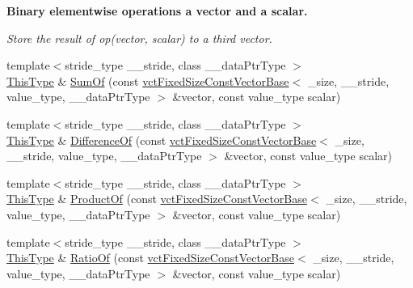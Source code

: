 \begin{Indent}{\bf Binary elementwise operations a vector and a scalar.}\par
{\em Store the result of op(vector, scalar) to a third vector. }\begin{DoxyCompactItemize}
\item 
{\footnotesize template$<$stride\+\_\+type \+\_\+\+\_\+stride, class \+\_\+\+\_\+data\+Ptr\+Type $>$ }\\\hyperlink{classvct_fixed_size_const_vector_base_a071063bc4fa43112cc287b2dbef53180}{This\+Type} \& \hyperlink{classvct_fixed_size_vector_base_a22b2c7baaf63523781a9b183a491691a}{Sum\+Of} (const \hyperlink{classvct_fixed_size_const_vector_base}{vct\+Fixed\+Size\+Const\+Vector\+Base}$<$ \+\_\+size, \+\_\+\+\_\+stride, value\+\_\+type, \+\_\+\+\_\+data\+Ptr\+Type $>$ \&vector, const value\+\_\+type scalar)
\item 
{\footnotesize template$<$stride\+\_\+type \+\_\+\+\_\+stride, class \+\_\+\+\_\+data\+Ptr\+Type $>$ }\\\hyperlink{classvct_fixed_size_const_vector_base_a071063bc4fa43112cc287b2dbef53180}{This\+Type} \& \hyperlink{classvct_fixed_size_vector_base_a5f62b082dbcc5215f3a104cc205bc6f4}{Difference\+Of} (const \hyperlink{classvct_fixed_size_const_vector_base}{vct\+Fixed\+Size\+Const\+Vector\+Base}$<$ \+\_\+size, \+\_\+\+\_\+stride, value\+\_\+type, \+\_\+\+\_\+data\+Ptr\+Type $>$ \&vector, const value\+\_\+type scalar)
\item 
{\footnotesize template$<$stride\+\_\+type \+\_\+\+\_\+stride, class \+\_\+\+\_\+data\+Ptr\+Type $>$ }\\\hyperlink{classvct_fixed_size_const_vector_base_a071063bc4fa43112cc287b2dbef53180}{This\+Type} \& \hyperlink{classvct_fixed_size_vector_base_ab7bb38831df41327f20741da7ad95273}{Product\+Of} (const \hyperlink{classvct_fixed_size_const_vector_base}{vct\+Fixed\+Size\+Const\+Vector\+Base}$<$ \+\_\+size, \+\_\+\+\_\+stride, value\+\_\+type, \+\_\+\+\_\+data\+Ptr\+Type $>$ \&vector, const value\+\_\+type scalar)
\item 
{\footnotesize template$<$stride\+\_\+type \+\_\+\+\_\+stride, class \+\_\+\+\_\+data\+Ptr\+Type $>$ }\\\hyperlink{classvct_fixed_size_const_vector_base_a071063bc4fa43112cc287b2dbef53180}{This\+Type} \& \hyperlink{classvct_fixed_size_vector_base_ad1531f0ded01b99b53053de3c6bc07f7}{Ratio\+Of} (const \hyperlink{classvct_fixed_size_const_vector_base}{vct\+Fixed\+Size\+Const\+Vector\+Base}$<$ \+\_\+size, \+\_\+\+\_\+stride, value\+\_\+type, \+\_\+\+\_\+data\+Ptr\+Type $>$ \&vector, const value\+\_\+type scalar)

\end{DoxyCompactItemize}
\end{Indent}

